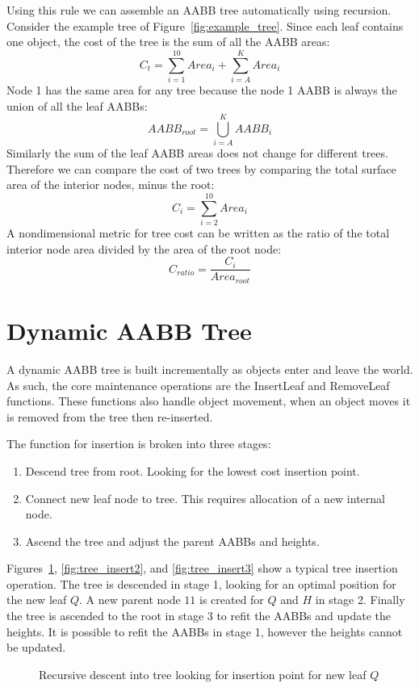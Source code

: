 \documentclass{article}
\begin{document}
Using this rule we can assemble an AABB tree automatically using recursion. Consider the example tree of Figure~\ref{fig:example_tree}. Since each leaf contains one object, the cost of the tree is the sum of all the AABB areas:
\[ C_t = \sum_{i=1}^{10} Area_i + \sum_{i=A}^K Area_i\]
Node 1 has the same area for any tree because the node 1 AABB is always the union of all the leaf AABBs:
\[ AABB_{root} = \bigcup_{i=A}^K AABB_i \]
Similarly the sum of the leaf AABB areas does not change for different trees. Therefore we can compare the cost of two trees by comparing the total surface area of the interior nodes, minus the root:
\[ C_i = \sum_{i=2}^{10} Area_i \]
A nondimensional metric for tree cost can be written as the ratio of the total interior node area divided by the area of the root node:
\[ C_{ratio} = \frac{C_i}{Area_{root}} \]

\section{Dynamic AABB Tree}
A dynamic AABB tree is built incrementally as objects enter and leave the world. As such, the core maintenance operations are the InsertLeaf and RemoveLeaf functions. These functions also handle object movement, when an object moves it is removed from the tree then re-inserted.

The function for insertion is broken into three stages:
\begin{enumerate}
	\item Descend tree from root. Looking for the lowest cost insertion point.
	\item Connect new leaf node to tree. This requires allocation of a new internal node.
	\item Ascend the tree and adjust the parent AABBs and heights.
\end{enumerate}

Figures~\ref{fig:tree_insert1}, \ref{fig:tree_insert2}, and \ref{fig:tree_insert3} show a typical tree insertion operation. The tree is descended in stage 1, looking for an optimal position for the new leaf $Q$. A new parent node $11$ is created for $Q$ and $H$ in stage 2. Finally the tree is ascended to the root in stage 3 to refit the AABBs and update the heights. It is possible to refit the AABBs in stage 1, however the heights cannot be updated.

\begin{figure}
	\begin{center}
		
	\end{center}
	\caption{Recursive descent into tree looking for insertion point for new leaf $Q$}
	\label{fig:tree_insert1}
\end{figure}
\end{document}
